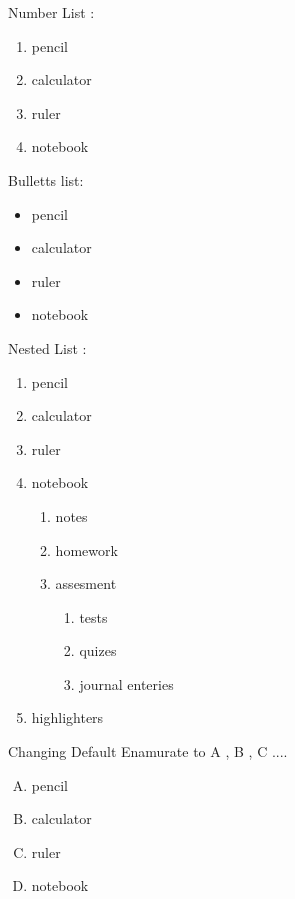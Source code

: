 \documentclass[11pt]{article}              %
\begin{document}
	
	Number List :
	\begin{enumerate}		                %
		\item pencil
		\item calculator
		\item ruler
		\item notebook
	\end{enumerate}
	
	\vspace{1cm}
	Bulletts list:
	\begin{itemize}		                %
		\item pencil
		\item calculator
		\item ruler
		\item notebook
	\end{itemize}
	
	\vspace{1cm}
	Nested List :
	\begin{enumerate}		                %
		\item pencil
		\item calculator
		\item ruler
		\item notebook
		\begin{enumerate}		            %
			\item notes
			\item homework
			\item assesment
			\begin{enumerate}        %
				\item tests
				\item quizes
				\item journal enteries
			\end{enumerate}
		\end{enumerate}
		\item highlighters
	\end{enumerate}
	
	\vspace{1cm}
	Changing Default Enamurate to A , B , C ....
	\begin{enumerate}[A.]		            %
		\item pencil
		\item calculator
		\item ruler
		\item notebook
	\end{enumerate}
	
\end{document}
